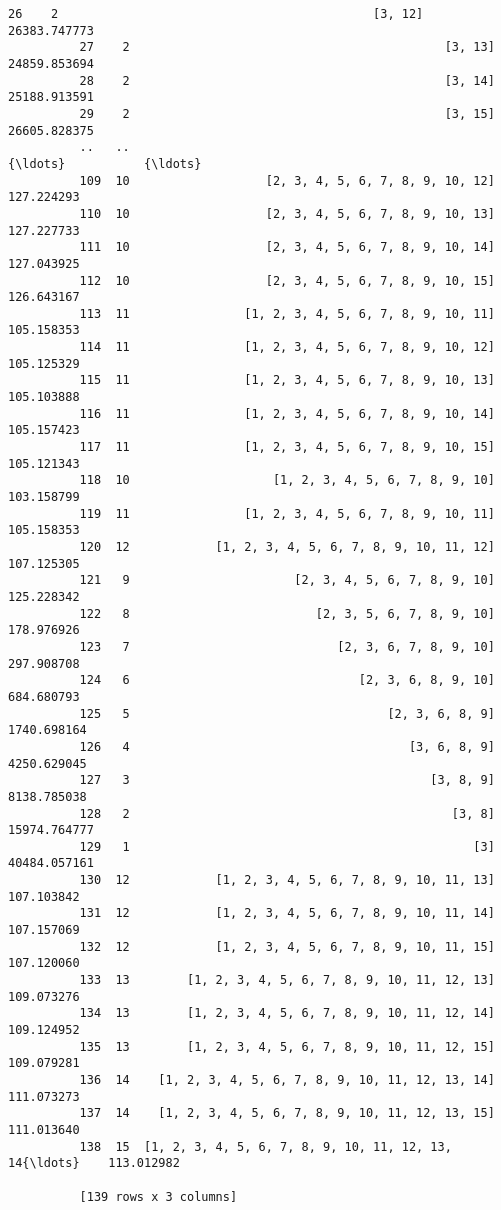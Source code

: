 \documentclass[11pt]{article}
\begin{document}
\begin{Verbatim}[commandchars=\\\{\}]
          26    2                                            [3, 12]  26383.747773
          27    2                                            [3, 13]  24859.853694
          28    2                                            [3, 14]  25188.913591
          29    2                                            [3, 15]  26605.828375
          ..   ..                                                {\ldots}           {\ldots}
          109  10                   [2, 3, 4, 5, 6, 7, 8, 9, 10, 12]    127.224293
          110  10                   [2, 3, 4, 5, 6, 7, 8, 9, 10, 13]    127.227733
          111  10                   [2, 3, 4, 5, 6, 7, 8, 9, 10, 14]    127.043925
          112  10                   [2, 3, 4, 5, 6, 7, 8, 9, 10, 15]    126.643167
          113  11                [1, 2, 3, 4, 5, 6, 7, 8, 9, 10, 11]    105.158353
          114  11                [1, 2, 3, 4, 5, 6, 7, 8, 9, 10, 12]    105.125329
          115  11                [1, 2, 3, 4, 5, 6, 7, 8, 9, 10, 13]    105.103888
          116  11                [1, 2, 3, 4, 5, 6, 7, 8, 9, 10, 14]    105.157423
          117  11                [1, 2, 3, 4, 5, 6, 7, 8, 9, 10, 15]    105.121343
          118  10                    [1, 2, 3, 4, 5, 6, 7, 8, 9, 10]    103.158799
          119  11                [1, 2, 3, 4, 5, 6, 7, 8, 9, 10, 11]    105.158353
          120  12            [1, 2, 3, 4, 5, 6, 7, 8, 9, 10, 11, 12]    107.125305
          121   9                       [2, 3, 4, 5, 6, 7, 8, 9, 10]    125.228342
          122   8                          [2, 3, 5, 6, 7, 8, 9, 10]    178.976926
          123   7                             [2, 3, 6, 7, 8, 9, 10]    297.908708
          124   6                                [2, 3, 6, 8, 9, 10]    684.680793
          125   5                                    [2, 3, 6, 8, 9]   1740.698164
          126   4                                       [3, 6, 8, 9]   4250.629045
          127   3                                          [3, 8, 9]   8138.785038
          128   2                                             [3, 8]  15974.764777
          129   1                                                [3]  40484.057161
          130  12            [1, 2, 3, 4, 5, 6, 7, 8, 9, 10, 11, 13]    107.103842
          131  12            [1, 2, 3, 4, 5, 6, 7, 8, 9, 10, 11, 14]    107.157069
          132  12            [1, 2, 3, 4, 5, 6, 7, 8, 9, 10, 11, 15]    107.120060
          133  13        [1, 2, 3, 4, 5, 6, 7, 8, 9, 10, 11, 12, 13]    109.073276
          134  13        [1, 2, 3, 4, 5, 6, 7, 8, 9, 10, 11, 12, 14]    109.124952
          135  13        [1, 2, 3, 4, 5, 6, 7, 8, 9, 10, 11, 12, 15]    109.079281
          136  14    [1, 2, 3, 4, 5, 6, 7, 8, 9, 10, 11, 12, 13, 14]    111.073273
          137  14    [1, 2, 3, 4, 5, 6, 7, 8, 9, 10, 11, 12, 13, 15]    111.013640
          138  15  [1, 2, 3, 4, 5, 6, 7, 8, 9, 10, 11, 12, 13, 14{\ldots}    113.012982
          
          [139 rows x 3 columns]
\end{Verbatim}
            
\end{document}

